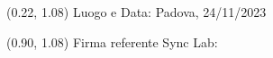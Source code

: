\documentclass{article}
\begin{document}
    
    
\begin{textblock*}{\textwidth}(0.22\textwidth, 1.08\textheight)
    Luogo e Data: Padova, 24/11/2023
\end{textblock*}

\begin{textblock*}{\textwidth}(0.90\textwidth, 1.08\textheight)
        Firma referente Sync Lab:
\end{textblock*}
\end{document}
